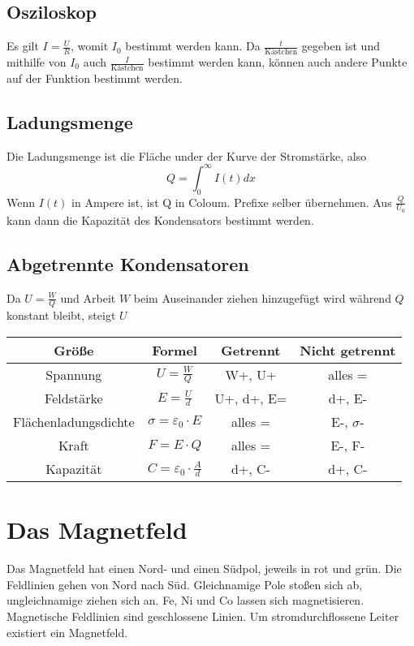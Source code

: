 \documentclass{article}
\begin{document}
\subsection{Osziloskop} 
Es gilt $I=\frac{U}{R}$, womit $I_0$ bestimmt werden kann. Da $\frac{t}{\text{Kästchen}}$ gegeben ist und mithilfe von $I_0$ auch $\frac{I}{\text{Kästchen}}$ bestimmt werden kann, können auch andere Punkte auf der Funktion bestimmt werden. 
 
\subsection{Ladungsmenge}
Die Ladungsmenge ist die Fläche under der Kurve der Stromstärke, also
\[Q=\int^\infty_0 I(t) dx\]
Wenn $I(t)$ in Ampere ist, ist Q in Coloum. Prefixe selber übernehmen.
Aus $\frac{Q}{U_0}$ kann dann die Kapazität des Kondensators bestimmt werden.
 
\subsection{Abgetrennte Kondensatoren} 
Da $U=\frac{W}{Q}$ und Arbeit $W$ beim Auseinander ziehen hinzugefügt wird während $Q$ konstant bleibt, steigt $U$  
  
\begin{center}
\begin{tabular}{ |c|c|c|c| }
\hline
 Größe & Formel & Getrennt & Nicht getrennt \\
\hline
 Spannung & $U=\frac{W}{Q}$ & W+, U+ & alles = \\
\hline
 Feldstärke & $E=\frac{U}{d}$ & U+, d+, E= & d+, E-\\
\hline
 Flächenladungsdichte & $\sigma=\varepsilon_0 \cdot E$ & alles = & E-, $\sigma$-\\
\hline
 Kraft & $F=E \cdot Q$ & alles = & E-, F-\\
\hline
 Kapazität & $C=\varepsilon_0 \cdot \frac{A}{d}$ & d+, C- & d+, C-\\
\hline
\end{tabular}
\end{center}
  
\section{Das Magnetfeld}
Das Magnetfeld hat einen Nord- und einen Südpol, jeweils in rot und grün. Die Feldlinien gehen von Nord nach Süd.
Gleichnamige Pole stoßen sich ab, ungleichnamige ziehen sich an.
Fe, Ni und Co lassen sich magnetisieren.
Magnetische Feldlinien sind geschlossene Linien.
Um stromdurchflossene Leiter existiert ein Magnetfeld. 
 
\end{document}
